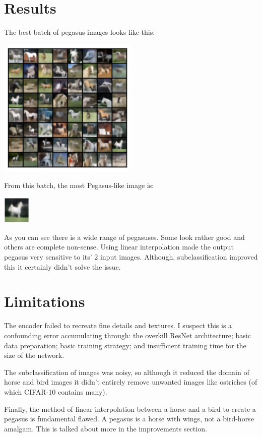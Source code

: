 \documentclass{article}
\begin{document}
\section{Results}
The best batch of pegasus images looks like this:
\begin{center}
    \includegraphics[width=0.5\textwidth]{figures/possible_64.png}
\end{center}
From this batch, the most Pegasus-like image is:
\begin{center}
    \includegraphics[width=0.1\textwidth]{figures/possible_1.png}
\end{center}

As you can see there is a wide range of pegasuses. Some look rather good and others are complete non-sense. Using linear interpolation made the output pegasus very sensitive to its' 2 input images. Although, subclassification improved this it certainly didn't solve the issue.

\section{Limitations}
The encoder failed to recreate fine details and textures. I suspect this is a confounding error accumulating through: the overkill ResNet architecture; basic data preparation; basic training strategy; and insufficient training time for the size of the network.

The subclassification of images was noisy, so although it reduced the domain of horse and bird images it didn't entirely remove unwanted images like ostriches (of which CIFAR-10 contains many).

Finally, the method of linear interpolation between a horse and a bird to create a pegasus is fundamental flawed. A pegasus is a horse with wings, not a bird-horse amalgam. This is talked about more in the improvements section.  
\end{document}
